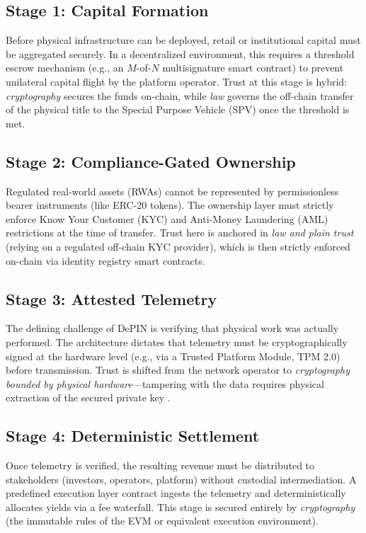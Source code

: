 \documentclass[conference]{IEEEtran}
\begin{document}
\subsection{Stage 1: Capital Formation}
Before physical infrastructure can be deployed, retail or institutional capital must be aggregated securely. In a decentralized environment, this requires a threshold escrow mechanism (e.g., an $M$-of-$N$ multisignature smart contract) to prevent unilateral capital flight by the platform operator. Trust at this stage is hybrid: \emph{cryptography} secures the funds on-chain, while \emph{law} governs the off-chain transfer of the physical title to the Special Purpose Vehicle (SPV) once the threshold is met.

\subsection{Stage 2: Compliance-Gated Ownership}
Regulated real-world assets (RWAs) cannot be represented by permissionless bearer instruments (like ERC-20 tokens). The ownership layer must strictly enforce Know Your Customer (KYC) and Anti-Money Laundering (AML) restrictions at the time of transfer. Trust here is anchored in \emph{law and plain trust} (relying on a regulated off-chain KYC provider), which is then strictly enforced on-chain via identity registry smart contracts.

\subsection{Stage 3: Attested Telemetry}
The defining challenge of DePIN is verifying that physical work was actually performed. The architecture dictates that telemetry must be cryptographically signed at the hardware level (e.g., via a Trusted Platform Module, TPM 2.0) before transmission. Trust is shifted from the network operator to \emph{cryptography bounded by physical hardware}—tampering with the data requires physical extraction of the secured private key \cite{boudguiga2017iot,tpm20spec}.

\subsection{Stage 4: Deterministic Settlement}
Once telemetry is verified, the resulting revenue must be distributed to stakeholders (investors, operators, platform) without custodial intermediation. A predefined execution layer contract ingests the telemetry and deterministically allocates yields via a fee waterfall. This stage is secured entirely by \emph{cryptography} (the immutable rules of the EVM or equivalent execution environment).
\end{document}
